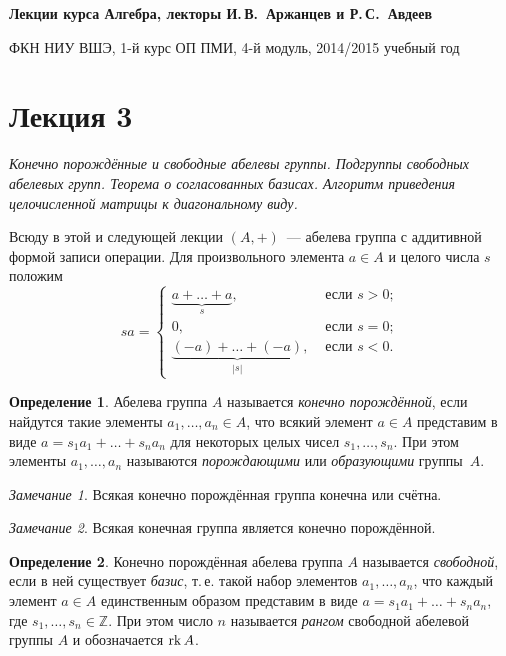 \documentclass[a4paper,10pt]{amsart}
\def\rk{{\rm rk}}%
\def\ZZ{{\mathbb Z}}%
\theoremstyle{definition}
\newtheorem{definition}{Определение}
\theoremstyle{remark}
\newtheorem{remark}{Замечание}
\begin{document}
%
\sloppy
%
\centerline{\large \bf Лекции курса \guillemotleft
Алгебра\guillemotright{}, лекторы И.\,В.~Аржанцев и Р.\,С.~Авдеев}

\smallskip

\centerline{\large ФКН НИУ ВШЭ, 1-й курс ОП ПМИ, 4-й модуль,
2014/2015 учебный год}


\bigskip

\section*{Лекция 3}

\medskip

{\it Конечно порождённые и свободные абелевы группы. Подгруппы
свободных абелевых групп. Теорема о согласованных базисах. Алгоритм
приведения целочисленной матрицы к диагональному виду.}

\medskip

Всюду в этой и следующей лекции $(A,+)$~--- абелева группа с
аддитивной формой записи операции. Для произвольного элемента $a\in
A$ и целого числа $s$ положим
$$
sa =
\begin{cases}
\underbrace{a + \ldots + a}_s, & \text{ если } s > 0; \\
0, & \text{ если } s = 0; \\
\underbrace{(-a) + \ldots + (-a)}_{|s|}, & \text{ если } s < 0.
\end{cases}
$$

\begin{definition}
Абелева группа $A$ называется {\it конечно порождённой}, если
найдутся такие элементы $a_1,\ldots,a_n\in A$, что всякий элемент
$a\in A$ представим в виде $a=s_1a_1 + \ldots + s_na_n$ для
некоторых целых чисел $s_1, \ldots, s_n$. При этом элементы $a_1,
\ldots, a_n$ называются {\it порождающими} или {\it образующими}
группы~$A$.
\end{definition}

\begin{remark}
Всякая конечно порождённая группа конечна или счётна.
\end{remark}

\begin{remark}
Всякая конечная группа является конечно порождённой.
\end{remark}

\begin{definition}
Конечно порождённая абелева группа $A$ называется {\it свободной},
если в ней существует {\it базис}, т.\,е. такой набор элементов
$a_1,\ldots, a_n$, что каждый элемент $a\in A$ единственным образом
представим в виде $a=s_1a_1 + \ldots + s_na_n$, где $s_1, \ldots,
s_n \in \ZZ$. При этом число $n$ называется {\it рангом} свободной
абелевой группы $A$ и обозначается $\rk\,A$.
\end{definition}
\end{document}
